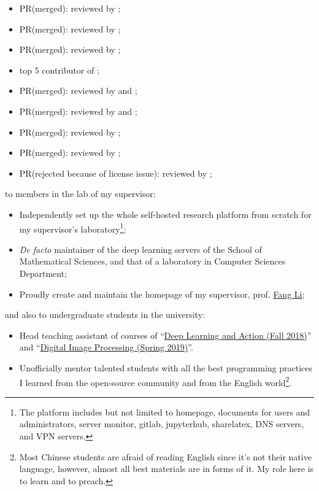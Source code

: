 \begin{itemize}
    \item PR(merged):  reviewed by \mbauman;
    \item PR(merged):  reviewed by \mikeinnes;
    \item PR(merged):  reviewed by \mikeinnes;
    \item top 5 contributor of \repoflux;
    \item PR(merged):  reviewed by \evizero and \timholy;
    \item PR(merged):  reviewed by \evizero and \timholy;
    \item PR(merged):  reviewed by \julio;
    \item PR(merged):  reviewed by \timholy;
    \item PR(rejected because of license issue):  reviewed by \timholy;
\end{itemize}
to members in the lab of my supervisor:
\begin{itemize}
    \item Independently set up the whole self-hosted research platform from scratch for my supervisor's laboratory\footnote{The platform includes but not limited to homepage, documents for users and administrators, server monitor, gitlab, jupyterhub, sharelatex, DNS servers, and VPN servers.};
    \item \textit{De facto} maintainer of the deep learning servers of the School of Mathematical Sciences, and that of a laboratory in Computer Sciences Department;
    \item Proudly create and maintain the homepage of my supervisor, prof. \href{http://math.ecnu.edu.cn/~fli/}{\textsf{Fang Li}};
\end{itemize}
and also to undergraduate students in the university:
\begin{itemize}
    \item Head teaching assistant of courses of ``\href{http://math.ecnu.edu.cn/~fli/Teaching/DeepLearning/Fall2018/index.html}{Deep Learning and Action (Fall 2018)}''  and ``\href{http://math.ecnu.edu.cn/~fli/Teaching/DigitalImageProcessing/Spring2019/index.html}{Digital Image Processing (Spring 2019)}''.
    \item Unofficially mentor talented students with all the best programming practices I learned from the open-source community and from the English world\footnote{Most Chinese students are afraid of reading English since it's not their native language, however, almost all best materials are in forms of it. My role here is to learn and to preach.}.
\end{itemize}

